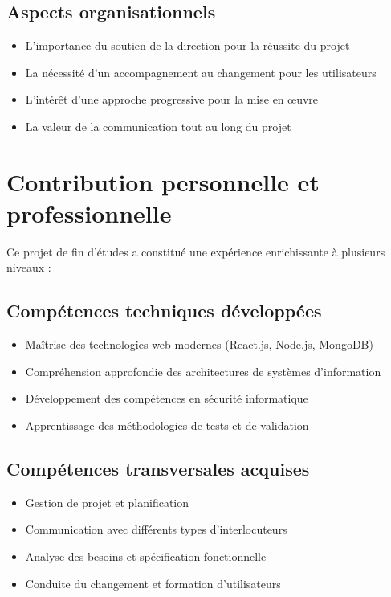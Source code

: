 \subsection*{Aspects organisationnels}

\begin{itemize}
    \item L'importance du soutien de la direction pour la réussite du projet
    \item La nécessité d'un accompagnement au changement pour les utilisateurs
    \item L'intérêt d'une approche progressive pour la mise en œuvre
    \item La valeur de la communication tout au long du projet
\end{itemize}

\section*{Contribution personnelle et professionnelle}

Ce projet de fin d'études a constitué une expérience enrichissante à plusieurs niveaux :

\subsection*{Compétences techniques développées}

\begin{itemize}
    \item Maîtrise des technologies web modernes (React.js, Node.js, MongoDB)
    \item Compréhension approfondie des architectures de systèmes d'information
    \item Développement des compétences en sécurité informatique
    \item Apprentissage des méthodologies de tests et de validation
\end{itemize}

\subsection*{Compétences transversales acquises}

\begin{itemize}
    \item Gestion de projet et planification
    \item Communication avec différents types d'interlocuteurs
    \item Analyse des besoins et spécification fonctionnelle
    \item Conduite du changement et formation d'utilisateurs
\end{itemize}

